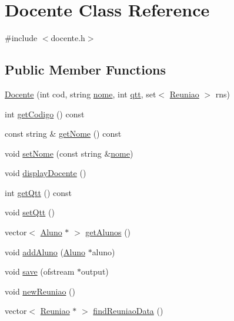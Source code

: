 \hypertarget{class_docente}{}\section{Docente Class Reference}
\label{class_docente}


{\ttfamily \#include $<$docente.\+h$>$}

\subsection*{Public Member Functions}
\begin{DoxyCompactItemize}
\item 
\hyperlink{class_docente_a6a5a2767071333f26d8b9f78e594c62a}{Docente} (int cod, string \hyperlink{class_docente_a66b320a22a0e829473b70f7fe11ac6d9}{nome}, int \hyperlink{class_docente_ab29ba6bb97580e8a8bb9dd5f53a532d6}{qtt}, set$<$ \hyperlink{class_reuniao}{Reuniao} $>$ rns)
\item 
int \hyperlink{class_docente_a9973620c09d6d48dc1871db5f0a9cd5b}{get\+Codigo} () const
\item 
const string \& \hyperlink{class_docente_ae9660cce3a01db623da50009781b0b77}{get\+Nome} () const
\item 
void \hyperlink{class_docente_a5e41a574e7adf0062530b80687224bc1}{set\+Nome} (const string \&\hyperlink{class_docente_a66b320a22a0e829473b70f7fe11ac6d9}{nome})
\item 
void \hyperlink{class_docente_ae0b73b4b0d10c25c23eb678f74e3c0e8}{display\+Docente} ()
\item 
int \hyperlink{class_docente_a9fb95f3bee62cfaf9a358cf102feb7e8}{get\+Qtt} () const
\item 
void \hyperlink{class_docente_a63f5f1b1a094a2366a148b33043f1f2d}{set\+Qtt} ()
\item 
vector$<$ \hyperlink{class_aluno}{Aluno} $\ast$ $>$ \hyperlink{class_docente_accbc43c2e9c79d2adbc6d49fe8de9697}{get\+Alunos} ()
\item 
void \hyperlink{class_docente_a9c594ff4aeb0fa373708c7440491c22d}{add\+Aluno} (\hyperlink{class_aluno}{Aluno} $\ast$aluno)
\item 
void \hyperlink{class_docente_a4c4a09cf3c7f03a6b45a9b2c98c4e815}{save} (ofstream $\ast$output)
\item 
void \hyperlink{class_docente_a69d24901234585a51e8dfe3dec22c00d}{new\+Reuniao} ()
\item 
vector$<$ \hyperlink{class_reuniao}{Reuniao} $\ast$ $>$ \hyperlink{class_docente_a41eda045287485cfdc5f94ebf1c1f44b}{find\+Reuniao\+Data} ()

\end{DoxyCompactItemize}
